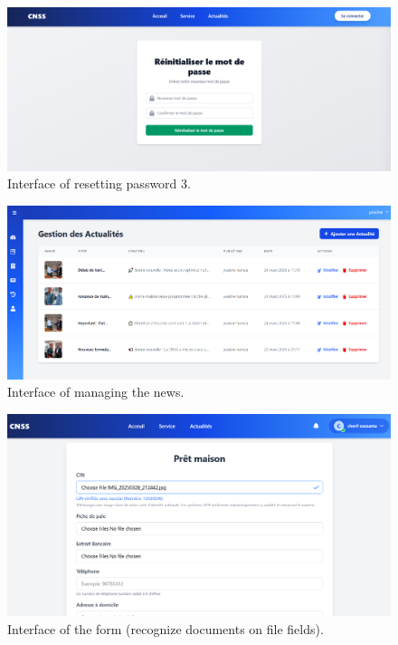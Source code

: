 \vspace{1.5cm}
\begin{figure}[h!]
    \centering
    \includegraphics[width=1\textwidth]{figures/ui-reset pass3.png}
    \caption{Interface of resetting password 3.}
\end{figure}
\clearpage
\begin{figure}[h!]
    \centering
    \includegraphics[width=1\textwidth]{figures/ui-manage news.png}
    \caption{Interface of managing the news.}
\end{figure}
\vspace{1.5cm}
\begin{figure}[h!]
    \centering
    \includegraphics[width=1\textwidth]{figures/ui-recognize ai.png}
    \caption{Interface of the form (recognize documents on file fields).}
\end{figure}
\clearpage
